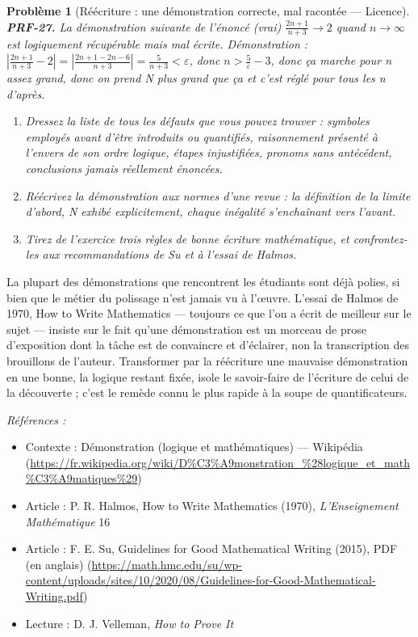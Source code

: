 \documentclass[11pt]{article}
\newtheorem{problem}{Problème}
\newenvironment{refs}{\par\small\noindent\emph{Références :}\begin{itemize}\setlength\itemsep{0pt}}{\end{itemize}\normalsize}
\begin{document}
\begin{problem}[{Réécriture : une démonstration correcte, mal racontée --- Licence}]
\textbf{PRF-27.} La démonstration suivante de l'énoncé (vrai)
\og{} $ \frac{2n+1}{n+3} \to 2 $ quand $ n \to \infty $ \fg{} est logiquement récupérable mais
mal écrite. \textit{Démonstration : $ \left| \frac{2n+1}{n+3} - 2 \right| = \left| \frac{2n+1-2n-6}{n+3} \right| = \frac{5}{n+3} <\varepsilon $,
donc $ n >\frac{5}{\varepsilon} - 3 $, donc ça marche pour n assez grand, donc on prend
N plus grand que ça et c'est réglé pour tous les n d'après. }~
\begin{enumerate}
\item[(a)] Dressez la liste de tous les défauts que vous pouvez trouver : symboles employés avant
d'être introduits ou quantifiés, raisonnement présenté à l'envers de son ordre logique,
étapes injustifiées, pronoms sans antécédent, conclusions jamais réellement énoncées.
\item[(b)] Réécrivez la démonstration
aux normes d'une revue : la définition de la limite d'abord, N exhibé explicitement, chaque
inégalité s'enchaînant vers l'avant.
\item[(c)] Tirez de l'exercice trois règles de bonne
écriture mathématique, et confrontez-les aux recommandations de Su et à l'essai de
Halmos.
\end{enumerate}

\end{problem}

\noindent La plupart des démonstrations que rencontrent les étudiants sont déjà
polies, si bien que le métier du polissage n'est jamais vu à l'\oe{}uvre. L'essai de Halmos de
1970, \og{} How to Write Mathematics \fg{} --- toujours ce que l'on a écrit de meilleur sur le sujet ---
insiste sur le fait qu'une démonstration est un morceau de prose d'exposition dont la tâche
est de convaincre et d'éclairer, non la transcription des brouillons de l'auteur. Transformer
par la réécriture une mauvaise démonstration en une bonne, la logique restant fixée, isole le
savoir-faire de l'écriture de celui de la découverte ; c'est le remède connu le plus rapide à
la soupe de quantificateurs.

\begin{refs}
\item Contexte : Démonstration (logique et mathématiques) --- Wikipédia (\url{https://fr.wikipedia.org/wiki/D%C3%A9monstration_%28logique_et_math%C3%A9matiques%29})
\item Article : P. R. Halmos, \og{} How to Write Mathematics \fg{} (1970), \textit{L'Enseignement Mathématique} 16
\item Article : F. E. Su, \og{} Guidelines for Good Mathematical Writing \fg{} (2015), PDF (en anglais) (\url{https://math.hmc.edu/su/wp-content/uploads/sites/10/2020/08/Guidelines-for-Good-Mathematical-Writing.pdf})
\item Lecture : D. J. Velleman, \textit{How to Prove It}
\end{refs}
\end{document}
